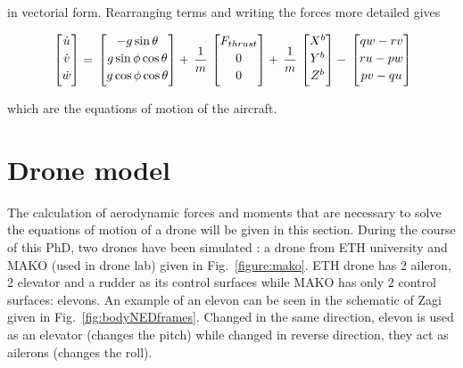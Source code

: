 in vectorial form. Rearranging terms and writing the forces more detailed gives 

\begin{equation}{\label{eqn:dynamicsEquation2}}
\begin{bmatrix}
\dot{u}\\[0.2em]
\dot{v}\\[0.2em]
\dot{w}\\[0.2em]
\end{bmatrix}
=\,
\begin{bmatrix}
{-g \sin{\theta}}\\[0.2em]
{g \sin{\phi} \cos{\theta} }\\[0.2em]
{g \cos{\phi} \cos{\theta}}\\[0.2em]
\end{bmatrix}
+\,
\frac{1}{m}
\,
\begin{bmatrix}
F_{thrust}\\[0.2em]
0\\[0.2em]
0\\[0.2em]
\end{bmatrix}
+\,
\frac{1}{m}
\,
\begin{bmatrix}
X^b\\[0.2em]
Y^b\\[0.2em]
Z^b\\[0.2em]
\end{bmatrix}
-\,
\begin{bmatrix}
qw-rv\\[0.2em]
ru-pw\\[0.2em]
pv-qu\\[0.2em]
\end{bmatrix}
\end{equation}

which are the equations of motion of the aircraft. 

\section{Drone model}

The calculation of aerodynamic forces and moments that are necessary to solve the equations of motion of a drone will be given in this section. 
During the course of this PhD, two drones have been simulated : a drone from ETH university \cite{ducard2009fault} and MAKO (used in drone lab) given in Fig.~\ref{figure:mako}. 
ETH drone has 2 aileron, 2 elevator and a rudder as its control surfaces while MAKO has only 2 control surfaces: elevons. 
An example of an elevon can be seen in the schematic of Zagi given in Fig.~\ref{fig:bodyNEDframes}. 
Changed in the same direction, elevon is used as an elevator (changes the pitch) while changed in reverse direction, they act as ailerons (changes the roll). 


